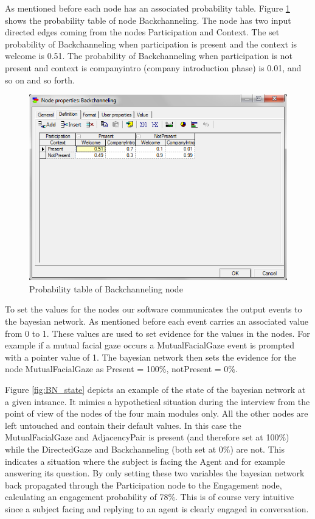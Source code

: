 \documentclass[12pt, a4paper, fleqn]{memoir}%
\begin{document}
As mentioned before each node has an associated probability table. Figure \ref{fig:BN_probability_table} shows the probability table of node Backchanneling. The node has two input directed edges coming from the nodes Participation and Context. The set probability of Backchanneling when participation is present and the context is welcome is 0.51. The probability of Backchanneling when participation is not present and context is companyintro (company introduction phase) is 0.01, and so on and so forth.

\begin{figure}[h!]
    \centering
    \includegraphics[width=1\textwidth]{BN_probability_table}
    \caption{Probability table of Backchanneling node}
    \label{fig:BN_probability_table}
\end{figure}

To set the values for the nodes our software communicates the output events to the bayesian network. As mentioned before each event carries an associated value from 0 to 1. These values are used to set evidence for the values in the nodes. For example if a mutual facial gaze occurs a MutualFacialGaze event is prompted with a pointer value of 1. The bayesian network then sets the evidence for the node MutualFacialGaze as Present = 100\%, notPresent = 0\%.

Figure \ref{fig:BN_state} depicts an example of the state of the bayesian network at a given intsance. It mimics a hypothetical situation during the interview from the point of view of the nodes of the four main modules only. All the other nodes are left untouched and contain their default values. In this case the MutualFacialGaze and AdjacencyPair is present (and therefore set at 100\%) while the DirectedGaze and Backchanneling (both set at 0\%) are not. This indicates a situation where the subject is facing the Agent and for example answering its question. By only setting these two variables the bayesian network back propagated through the Participation node to the Engagement node, calculating an engagement probability of 78\%. This is of course very intuitive since a subject facing and replying to an agent is clearly engaged in conversation.
\end{document}
